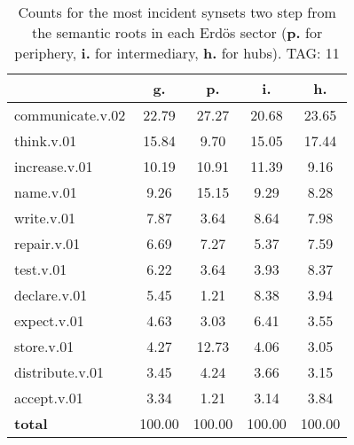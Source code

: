 \begin{table}[h!]
\begin{center}
\begin{tabular}{| l | c | c | c | c |}\hline
 & g. & p. & i. & h. \\\hline
communicate.v.02 & 22.79  & 27.27  & 20.68  & 23.65 \\\hline
think.v.01 & 15.84  & 9.70  & 15.05  & 17.44 \\\hline
increase.v.01 & 10.19  & 10.91  & 11.39  & 9.16 \\\hline
name.v.01 & 9.26  & 15.15  & 9.29  & 8.28 \\\hline
write.v.01 & 7.87  & 3.64  & 8.64  & 7.98 \\\hline
repair.v.01 & 6.69  & 7.27  & 5.37  & 7.59 \\\hline
test.v.01 & 6.22  & 3.64  & 3.93  & 8.37 \\\hline
declare.v.01 & 5.45  & 1.21  & 8.38  & 3.94 \\\hline
expect.v.01 & 4.63  & 3.03  & 6.41  & 3.55 \\\hline
store.v.01 & 4.27  & 12.73  & 4.06  & 3.05 \\\hline
distribute.v.01 & 3.45  & 4.24  & 3.66  & 3.15 \\\hline
accept.v.01 & 3.34  & 1.21  & 3.14  & 3.84 \\\hline
{{\bf total}} & 100.00  & 100.00  & 100.00  & 100.00 \\\hline
\end{tabular}
\caption{Counts for the most incident synsets two step from the semantic roots in each Erd\"os sector ({\bf p.} for periphery, {\bf i.} for intermediary, {\bf h.} for hubs). TAG: 11}
\end{center}
\end{table}